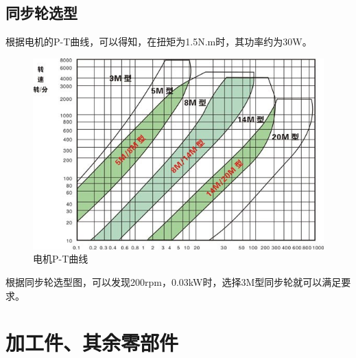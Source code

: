 \documentclass[12pt]{article}
\begin{document}
\begin{CJK}{UTF8}{song}
\subsection{同步轮选型}
根据电机的P-T曲线，可以得知，在扭矩为1.5N.m时，其功率约为30W。
 \begin{figure}[H]
\centering
\includegraphics[width=.8\textwidth]{chap3//fig9.jpg}
\caption{电机P-T曲线}
\end{figure}
根据同步轮选型图，可以发现200rpm，0.03kW时，选择3M型同步轮就可以满足要求。


\section{加工件、其余零部件}

\end{CJK}
\end{document}
